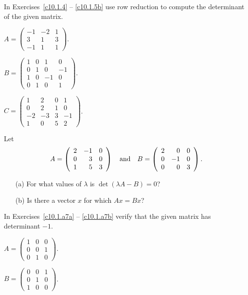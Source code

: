 \noindent In Exercises~\ref{c10.1.4} -- \ref{c10.1.5b} use row reduction 
to compute the determinant of the given matrix.
\begin{exercise} \label{c10.1.4}
$A = \left(\begin{array}{rrr} -1 & -2 & 1 \\ 3 & 1 & 3 \\ -1 & 1 & 1
\end{array} \right)$. 
\end{exercise}
\begin{exercise} \label{c10.1.5a}
$B = \left(\begin{array}{rrrr} 1 & 0 & 1 & 0 \\ 0 & 1 & 0 & -1 \\
1 & 0 & -1 & 0 \\ 0 & 1 & 0 & 1 \end{array}\right)$.
\end{exercise}
\begin{exercise} \label{c10.1.5b}
$C = \left(\begin{array}{rrrr} 1 & 2 & 0 & 1 \\ 0 & 2 & 1 & 0 \\
-2 & -3 & 3 & -1 \\ 1 & 0 & 5 & 2 \end{array}\right)$.
\end{exercise}

\begin{exercise} \label{c10.1.6}
Let 
\[
A = \left(\begin{array}{rrr} 2 & -1 & 0 \\ 0 & 3 & 0 \\ 1 & 5 & 3
\end{array} \right)  \quad\mbox{and}\quad
B = \left(\begin{array}{rrr} 2 & 0 & 0 \\ 0 & -1 & 0 \\ 0 & 0 & 3
\end{array} \right).
\]
\begin{itemize}
\item[(a)] For what values of $\lambda$ is  $\det(\lambda A-B)=0$?
\item[(b)] Is there a vector $x$ for which $Ax=Bx$?
\end{itemize}
\end{exercise}

\noindent In Exercises~\ref{c10.1.a7a} -- \ref{c10.1.a7b} verify 
that the given matrix has determinant $-1$.
\begin{exercise} \label{c10.1.a7a}
$A = \left( \begin{array}{rrr}
1  &  0  &  0\\
0  &  0  &  1\\
0  &  1  &  0
\end{array} \right)$.
\end{exercise}
\begin{exercise} \label{c10.1.a7b}
$B = \left( \begin{array}{rrr}
 0 &   0 &   1\\
 0 &   1 &   0\\
 1 &   0 &   0
\end{array} \right)$.
\end{exercise}


